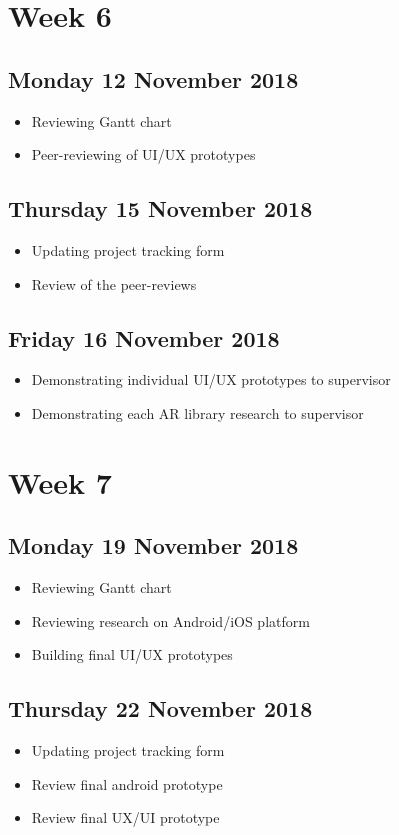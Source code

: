 \section*{Week 6}
\subsection*{Monday 12 November 2018}
\begin{itemize}
	\item Reviewing Gantt chart
	\item Peer-reviewing of UI/UX prototypes
\end{itemize}

\subsection*{Thursday 15 November 2018}
\begin{itemize}
	\item Updating project tracking form
	\item Review of the peer-reviews
\end{itemize}

\subsection*{Friday 16 November 2018}
\begin{itemize}
	\item Demonstrating individual UI/UX prototypes to supervisor
	\item Demonstrating each AR library research to supervisor
\end{itemize}

\section*{Week 7}
\subsection*{Monday 19 November 2018}
\begin{itemize}
	\item Reviewing Gantt chart
	\item Reviewing research on Android/iOS platform
	\item Building final UI/UX prototypes
\end{itemize}

\subsection*{Thursday 22 November 2018}
\begin{itemize}
	\item Updating project tracking form
	\item Review final android prototype
	\item Review final UX/UI prototype
\end{itemize}

